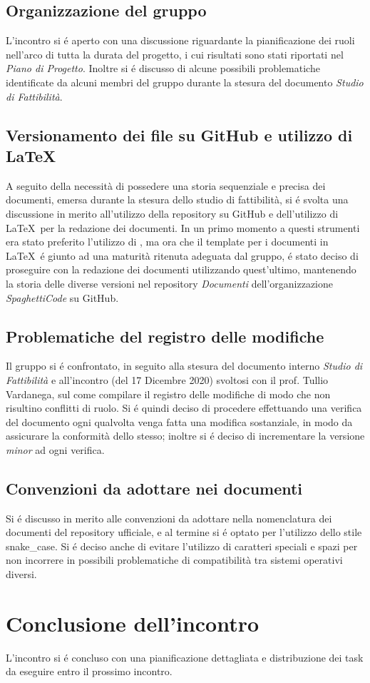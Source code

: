 \documentclass{article}
\begin{document}
	\subsection{Organizzazione del gruppo}
	\label{sub:organizzazione_gruppo}
	L'incontro si é aperto con una discussione riguardante la pianificazione dei ruoli nell'arco di tutta la durata del progetto, i cui risultati sono stati riportati nel 
	\textit{Piano di Progetto}. Inoltre si é discusso di alcune possibili problematiche identificate da alcuni membri del gruppo durante la stesura del documento 
	\textit{Studio di Fattibilità}.
	
	\subsection{Versionamento dei file su GitHub e utilizzo di \LaTeX}
	\label{sub:git_latex}
	A seguito della necessità di possedere una storia sequenziale e precisa dei documenti, emersa durante la stesura dello studio di fattibilità, si é svolta una discussione in merito 
	all'utilizzo della repository su GitHub e dell'utilizzo di \LaTeX\ per la redazione dei documenti. In un primo momento a questi strumenti era stato preferito 
	l'utilizzo di , ma ora che il template per i documenti in \LaTeX\ é giunto ad una maturità ritenuta adeguata dal gruppo, é stato deciso di 
	proseguire con la redazione dei documenti utilizzando quest'ultimo, mantenendo la storia delle diverse versioni nel repository \textit{Documenti} dell'organizzazione 
	\emph{SpaghettiCode} su GitHub.

	\subsection{Problematiche del registro delle modifiche}
	\label{sub:registro_modifiche}
	Il gruppo si é confrontato, in seguito alla stesura del documento interno \textit{Studio di Fattibilità} e all'incontro (del 17 Dicembre 2020) svoltosi con il prof. Tullio 
	Vardanega, sul come compilare il registro delle modifiche di modo che non risultino conflitti di ruolo. Si é quindi deciso di procedere effettuando una verifica del documento ogni 
	qualvolta venga fatta una modifica sostanziale, in modo da assicurare la conformità dello stesso; inoltre si é deciso di incrementare la versione \textit{minor} ad ogni verifica.

	\subsection{Convenzioni da adottare nei documenti}
	\label{sub:convenzioni}
	Si é discusso in merito alle convenzioni da adottare nella nomenclatura dei documenti del repository ufficiale, e al termine si é optato per l'utilizzo dello stile \glossario
	{snake\_case}. Si é deciso anche di evitare l'utilizzo di caratteri speciali e spazi per non incorrere in possibili problematiche di compatibilità tra sistemi operativi diversi.

\section{Conclusione dell'incontro}
\label{sec:conclusione}
L'incontro si é concluso con una pianificazione dettagliata e distribuzione dei task da eseguire entro il prossimo incontro.
\end{document}
